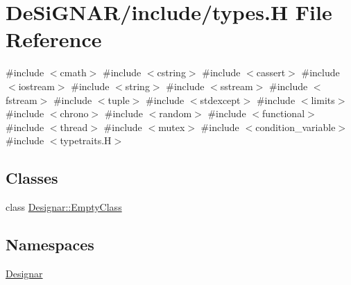 \hypertarget{types_8_h}{}\section{De\+Si\+G\+N\+A\+R/include/types.H File Reference}
\label{types_8_h}
{\ttfamily \#include $<$cmath$>$}\newline
{\ttfamily \#include $<$cstring$>$}\newline
{\ttfamily \#include $<$cassert$>$}\newline
{\ttfamily \#include $<$iostream$>$}\newline
{\ttfamily \#include $<$string$>$}\newline
{\ttfamily \#include $<$sstream$>$}\newline
{\ttfamily \#include $<$fstream$>$}\newline
{\ttfamily \#include $<$tuple$>$}\newline
{\ttfamily \#include $<$stdexcept$>$}\newline
{\ttfamily \#include $<$limits$>$}\newline
{\ttfamily \#include $<$chrono$>$}\newline
{\ttfamily \#include $<$random$>$}\newline
{\ttfamily \#include $<$functional$>$}\newline
{\ttfamily \#include $<$thread$>$}\newline
{\ttfamily \#include $<$mutex$>$}\newline
{\ttfamily \#include $<$condition\+\_\+variable$>$}\newline
{\ttfamily \#include $<$typetraits.\+H$>$}\newline
\subsection*{Classes}
\begin{DoxyCompactItemize}
\item 
class \hyperlink{class_designar_1_1_empty_class}{Designar\+::\+Empty\+Class}
\end{DoxyCompactItemize}
\subsection*{Namespaces}
\begin{DoxyCompactItemize}
\item 
 \hyperlink{namespace_designar}{Designar}
\end{DoxyCompactItemize}
